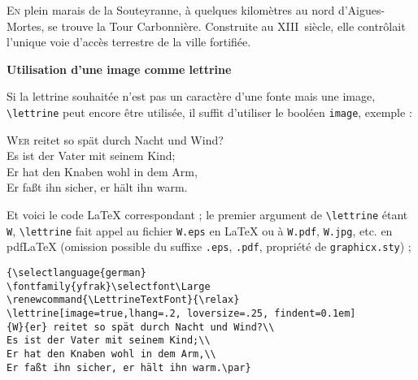 \documentclass[12pt,a4paper,german,french]{article}
\begin{document}
{%
\renewcommand{\LettrineFontHook}{\Typocapsfamily\color{black}}

\lettrine[findent=.3em]{E}{n} plein marais de la Souteyranne, à quelques
kilomètres au nord d'Aigues-Mortes, se trouve la Tour Carbonnière.
Construite au XIII\ieme~siècle, elle contrôlait l'unique voie d'accès
terrestre de la ville fortifiée.
\par}%

\newpage
\begin{center}
\large\bfseries Utilisation d'une image comme lettrine
\end{center}

\vspace{\baselineskip}
Si la lettrine souhaitée n'est pas un caractère d'une fonte mais une
image, \verb+\lettrine+ peut encore être utilisée, il suffit
d'utiliser le booléen \texttt{image}, exemple :

\begin{otherlanguage}{german}
\selectfont\Large
\renewcommand{\LettrineTextFont}{\relax}
\lettrine[image=true,lhang=.2, loversize=.25, findent=0.1em]
{W}{er} reitet so spät durch Nacht und Wind?\\
Es ist der Vater mit seinem Kind;\\
Er hat den Knaben wohl in dem Arm,\\
Er faßt ihn sicher, er hält ihn warm.\par
\end{otherlanguage}

\vspace{\baselineskip}
Et voici le code \LaTeX{} correspondant ;
le  premier argument de \verb+\lettrine+ étant \verb+W+,
\verb+\lettrine+ fait appel au fichier \verb+W.eps+ en \LaTeX{}
ou à \verb+W.pdf+, \verb+W.jpg+, etc. en pdf\LaTeX{} (omission
possible du suffixe \verb+.eps+,  \verb+.pdf+, propriété de
\verb+graphicx.sty+) ;

\begin{verbatim}
{\selectlanguage{german}
\fontfamily{yfrak}\selectfont\Large
\renewcommand{\LettrineTextFont}{\relax}
\lettrine[image=true,lhang=.2, loversize=.25, findent=0.1em]
{W}{er} reitet so spät durch Nacht und Wind?\\
Es ist der Vater mit seinem Kind;\\
Er hat den Knaben wohl in dem Arm,\\
Er faßt ihn sicher, er hält ihn warm.\par}
\end{verbatim}
\end{document}
